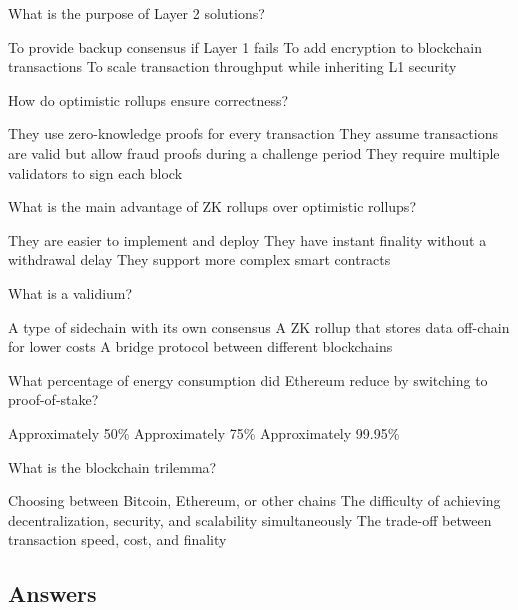 \documentclass[10pt,a4paper,american]{exam}
\begin{document}
\begin{questions}
	\question What is the purpose of Layer 2 solutions?
	\begin{randomizechoices}
		\choice To provide backup consensus if Layer 1 fails
		\choice To add encryption to blockchain transactions
		\CorrectChoice To scale transaction throughput while inheriting L1 security
	\end{randomizechoices}

	\question How do optimistic rollups ensure correctness?
	\begin{randomizechoices}
		\choice They use zero-knowledge proofs for every transaction
		\CorrectChoice They assume transactions are valid but allow fraud proofs during a challenge period
		\choice They require multiple validators to sign each block
	\end{randomizechoices}

	\question What is the main advantage of ZK rollups over optimistic rollups?
	\begin{randomizechoices}
		\choice They are easier to implement and deploy
		\CorrectChoice They have instant finality without a withdrawal delay
		\choice They support more complex smart contracts
	\end{randomizechoices}

	\question What is a validium?
	\begin{randomizechoices}
		\choice A type of sidechain with its own consensus
		\CorrectChoice A ZK rollup that stores data off-chain for lower costs
		\choice A bridge protocol between different blockchains
	\end{randomizechoices}

	\question What percentage of energy consumption did Ethereum reduce by switching to proof-of-stake?
	\begin{randomizechoices}
		\choice Approximately 50\%
		\choice Approximately 75\%
		\CorrectChoice Approximately 99.95\%
	\end{randomizechoices}

	\question What is the blockchain trilemma?
	\begin{randomizechoices}
		\choice Choosing between Bitcoin, Ethereum, or other chains
		\CorrectChoice The difficulty of achieving decentralization, security, and scalability simultaneously
		\choice The trade-off between transaction speed, cost, and finality
	\end{randomizechoices}

\end{questions}

\clearpage

\subsection*{Answers}
\printkeytable
\end{document}
